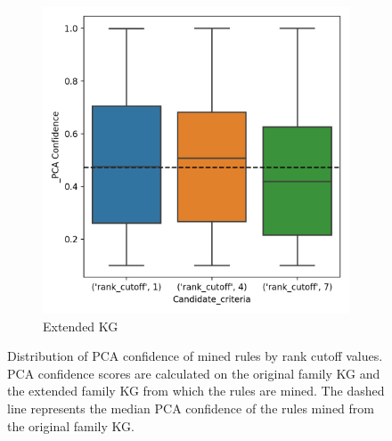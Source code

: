 \begin{figure}[h]
\begin{subfigure}{.5\textwidth}
  \includegraphics[width=1\linewidth]{figures/results/ranks/_PCA-rank_family.png}
  \caption{Extended KG}
  \label{fig:_PCA_rank_family_boxplot_sub}
\end{subfigure}
\caption{Distribution of PCA confidence of mined rules by rank cutoff values. PCA confidence scores are calculated on the original family KG and the extended family KG from which the rules are mined. The dashed line represents the median PCA confidence of the rules mined from the original family KG.}
\label{fig:PCA_entity_family_boxplot}
\end{figure}







